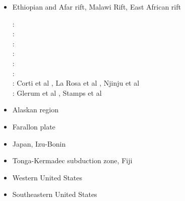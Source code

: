 \begin{itemize}
\item{Ethiopian and Afar rift, Malawi Rift, East African rift} 

\begin{scriptsize}
\twothousandseven:
\cite{mitk07}\\
\twothousandeight:
\cite{cort08}\\
\twothousandnine:
\cite{kekj09}\\
\twothousandten:
\cite{beve10}\\
\twothousandfourteen:
\cite{phcs14}\cite{sacs14}\\
\twothousandseventeen:
\cite{brcr17} \cite{brcg17}\\
\twothousandnineteen:
Corti et al \cite{cocf19}, La Rosa et al \cite{lapk19}, Njinju et al \cite{njas19}\\
\twothousandtwenty:
Glerum et al \cite{glbs20},
Stamps et al \cite{stkf20}
\end{scriptsize}

\item{Alaskan region} 
{\scriptsize
\cite{kohp10}
\cite{jabi10a}
\cite{jabi12}
\cite{jabr13}
\cite{haja17}
\cite{mimo18}
}
\item{Farallon plate} 
{\scriptsize
\cite{lisg08}
\cite{list11}
\cite{list12}
\cite{licu16}
}
\item{Japan, Izu-Bonin} 
{\scriptsize
\cite{hond85}
\cite{lohd07}
\cite{vakn12}
\cite{musi13}
\cite{kigk14}\cite{leli14}\cite{mova14}\cite{hond14}
\cite{kilk15}
\cite{yagz17}
\cite{yamg19}
\cite{mapg20}
}
\item{Tonga-Kermadec subduction zone, Fiji} 
{\scriptsize
\cite{bigs03}\cite{bigu03}
\cite{zhpy06}
}
\item{Western United States}
{\scriptsize
\cite{besb06}
}
\item{Southeastern United States}
{\scriptsize
\cite{heps18}
}


\end{itemize}
